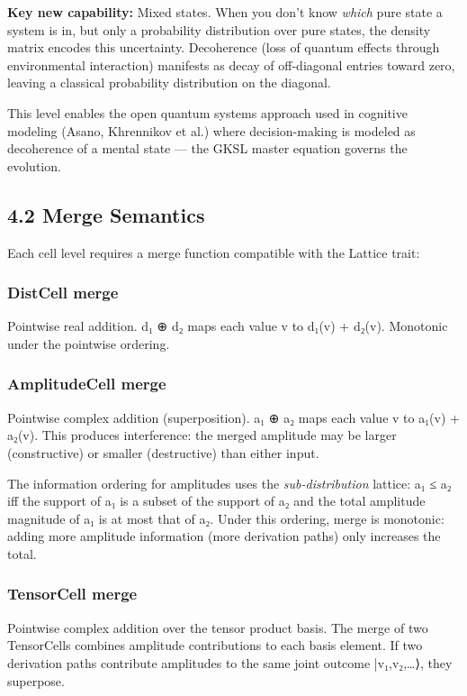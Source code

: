 \documentclass[11pt]{article}
\begin{document}
\textbf{Key new capability:} Mixed states. When you don't know \emph{which} pure state a
system is in, but only a probability distribution over pure states, the density
matrix encodes this uncertainty. Decoherence (loss of quantum effects through
environmental interaction) manifests as decay of off-diagonal entries toward
zero, leaving a classical probability distribution on the diagonal.

This level enables the open quantum systems approach used in cognitive modeling
(Asano, Khrennikov et al.) where decision-making is modeled as decoherence of
a mental state --- the GKSL master equation governs the evolution.
\subsection{4.2 Merge Semantics}
\label{sec:orgb2e54eb}

Each cell level requires a merge function compatible with the Lattice trait:
\subsubsection{DistCell merge}
\label{sec:org868096b}
Pointwise real addition. d₁ ⊕ d₂ maps each value v to d₁(v) + d₂(v).
Monotonic under the pointwise ordering.
\subsubsection{AmplitudeCell merge}
\label{sec:orga7cc515}
Pointwise complex addition (superposition). a₁ ⊕ a₂ maps each value v to
a₁(v) + a₂(v). This produces interference: the merged amplitude may be larger
(constructive) or smaller (destructive) than either input.

The information ordering for amplitudes uses the \emph{sub-distribution} lattice:
a₁ ≤ a₂ iff the support of a₁ is a subset of the support of a₂ and the total
amplitude magnitude of a₁ is at most that of a₂. Under this ordering, merge
is monotonic: adding more amplitude information (more derivation paths) only
increases the total.
\subsubsection{TensorCell merge}
\label{sec:org94fa38d}
Pointwise complex addition over the tensor product basis. The merge of two
TensorCells combines amplitude contributions to each basis element. If two
derivation paths contribute amplitudes to the same joint outcome |v₁,v₂,\ldots{}⟩,
they superpose.
\end{document}
